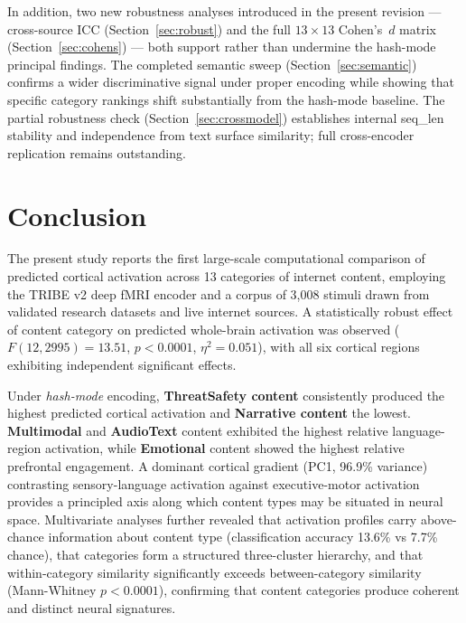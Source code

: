 \documentclass[11pt,letterpaper]{article}
\numberwithin{equation}{section}
\begin{document}
In addition, two new robustness analyses introduced in the present revision --- cross-source ICC (Section~\ref{sec:robust}) and the full $13\times13$ Cohen's~$d$ matrix (Section~\ref{sec:cohens}) --- both support rather than undermine the hash-mode principal findings. The completed semantic sweep (Section~\ref{sec:semantic}) confirms a wider discriminative signal under proper encoding while showing that specific category rankings shift substantially from the hash-mode baseline. The partial robustness check (Section~\ref{sec:crossmodel}) establishes internal seq\_len stability and independence from text surface similarity; full cross-encoder replication remains outstanding.

\FloatBarrier
\clearpage
\section{Conclusion}

The present study reports the first large-scale computational comparison of predicted cortical activation across 13 categories of internet content, employing the TRIBE v2 deep fMRI encoder and a corpus of 3{,}008 stimuli drawn from validated research datasets and live internet sources. A statistically robust effect of content category on predicted whole-brain activation was observed ($F(12, 2995) = 13.51$, $p < 0.0001$, $\eta^2 = 0.051$), with all six cortical regions exhibiting independent significant effects.

Under \emph{hash-mode} encoding, \textbf{ThreatSafety content} consistently produced the highest predicted cortical activation and \textbf{Narrative content} the lowest. \textbf{Multimodal} and \textbf{AudioText} content exhibited the highest relative language-region activation, while \textbf{Emotional} content showed the highest relative prefrontal engagement. A dominant cortical gradient (PC1, 96.9\% variance) contrasting sensory-language activation against executive-motor activation provides a principled axis along which content types may be situated in neural space. Multivariate analyses further revealed that activation profiles carry above-chance information about content type (classification accuracy 13.6\% vs 7.7\% chance), that categories form a structured three-cluster hierarchy, and that within-category similarity significantly exceeds between-category similarity (Mann-Whitney $p < 0.0001$), confirming that content categories produce coherent and distinct neural signatures.
\end{document}
